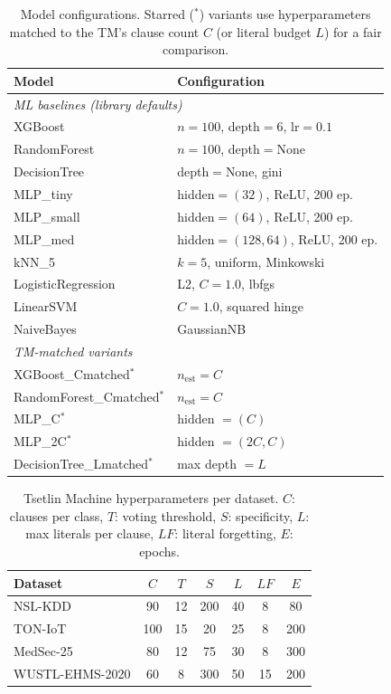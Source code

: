 \documentclass[journal,10pt]{IEEEtran}
\begin{document}
\begin{table}[t]
\centering
\caption{Model configurations. Starred ($^\ast$) variants use hyperparameters matched to the TM's clause count $C$ (or literal budget $L$) for a fair comparison.}
\label{tab:model_configs}
\begin{tabular}{ll}
\toprule
Model & Configuration \\
\midrule
\multicolumn{2}{l}{\textit{ML baselines (library defaults)}} \\
\midrule
XGBoost              & $n{=}100$, depth${=}6$, lr${=}0.1$ \\
RandomForest         & $n{=}100$, depth${=}$None \\
DecisionTree         & depth${=}$None, gini \\
MLP\_tiny            & hidden${=}(32)$, ReLU, 200 ep. \\
MLP\_small           & hidden${=}(64)$, ReLU, 200 ep. \\
MLP\_med             & hidden${=}(128,64)$, ReLU, 200 ep. \\
kNN\_5               & $k{=}5$, uniform, Minkowski \\
LogisticRegression   & L2, $C{=}1.0$, lbfgs \\
LinearSVM            & $C{=}1.0$, squared hinge \\
NaiveBayes           & GaussianNB \\
\midrule
\multicolumn{2}{l}{\textit{TM-matched variants}} \\
\midrule
XGBoost\_Cmatched$^\ast$      & $n_{\text{est}} = C$ \\
RandomForest\_Cmatched$^\ast$ & $n_{\text{est}} = C$ \\
MLP\_C$^\ast$                 & hidden ${=}(C)$ \\
MLP\_2C$^\ast$                & hidden ${=}(2C, C)$ \\
DecisionTree\_Lmatched$^\ast$ & max depth ${=}L$ \\
\bottomrule
\end{tabular}
\end{table}

\begin{table}[t]
\centering
\caption{Tsetlin Machine hyperparameters per dataset. $C$: clauses per class, $T$: voting threshold, $S$: specificity, $L$: max literals per clause, $LF$: literal forgetting, $E$: epochs.}
\label{tab:tm_hparams}
\begin{tabular}{lcccccc}
\toprule
Dataset & $C$ & $T$ & $S$ & $L$ & $LF$ & $E$ \\
\midrule
NSL-KDD         & 90  & 12 & 200 & 40 & 8  & 80  \\
TON-IoT         & 100 & 15 & 20  & 25 & 8  & 200 \\
MedSec-25       & 80  & 12 & 75  & 30 & 8  & 300 \\
WUSTL-EHMS-2020 & 60  & 8  & 300 & 50 & 15 & 200 \\
\bottomrule
\end{tabular}
\end{table}
\end{document}

